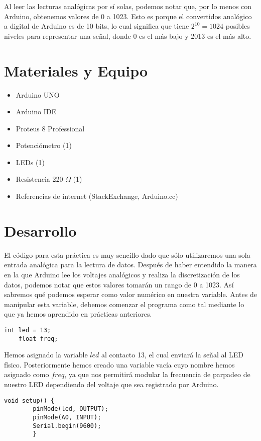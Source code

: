\documentclass[12pt, letterpaper]{article}
\begin{document}
Al leer las lecturas analógicas por sí solas, podemos notar que, por lo menos con Arduino, obtenemos valores de 0 a 1023. Esto es porque el convertidos analógico a digital de Arduino es de 10 bits, lo cual significa que tiene $2^{10} = 1024$ posibles niveles para representar una señal, donde 0 es el más bajo y 2013 es el más alto.

\section*{Materiales y Equipo}
\begin{itemize}
	\item Arduino UNO
	\item Arduino IDE
	\item Proteus 8 Professional
	\item Potenciómetro (1)
	\item LEDs (1)
	\item Resistencia 220 $\Omega$ (1)
	\item Referencias de internet (StackExchange, Arduino.cc)
\end{itemize}

\section*{Desarrollo}
El código para esta práctica es muy sencillo dado que sólo utilizaremos una sola entrada analógica para la lectura de datos. Después de haber entendido la manera en la que Arduino lee los voltajes analógicos y realiza la discretización de los datos, podemos notar que estos valores tomarán un rango de 0 a 1023. Así sabremos qué podemos esperar como valor numérico en nuestra variable. Antes de manipular esta variable, debemos comenzar el programa como tal mediante lo que ya hemos aprendido en prácticas anteriores.

\begin{lstlisting}[language=Arduino]
	int led = 13;
	float freq;
\end{lstlisting}

Hemos asignado la variable $led$ al contacto 13, el cual enviará la señal al LED físico. Posteriormente hemos creado una variable vacía cuyo nombre hemos asignado como $freq$, ya que nos permitirá modular la frecuencia de parpadeo de nuestro LED dependiendo del voltaje que sea registrado por Arduino.

\begin{lstlisting}[language=Arduino]
	void setup() {
		pinMode(led, OUTPUT);
		pinMode(A0, INPUT);
		Serial.begin(9600);
		}
\end{lstlisting}
\end{document}
